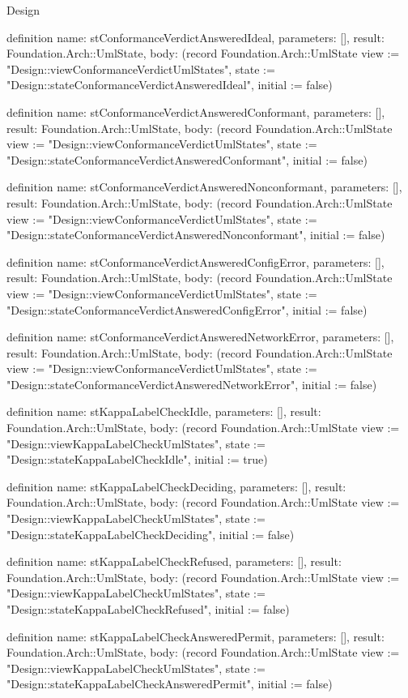 \begin{lexlean}{Design}
\begin{semanticmodule}
definition{
  name: stConformanceVerdictAnsweredIdeal,
  parameters: [],
  result: Foundation.Arch::UmlState,
  body: (record Foundation.Arch::UmlState {view := "Design::viewConformanceVerdictUmlStates", state := "Design::stateConformanceVerdictAnsweredIdeal", initial := false})
}

definition{
  name: stConformanceVerdictAnsweredConformant,
  parameters: [],
  result: Foundation.Arch::UmlState,
  body: (record Foundation.Arch::UmlState {view := "Design::viewConformanceVerdictUmlStates", state := "Design::stateConformanceVerdictAnsweredConformant", initial := false})
}

definition{
  name: stConformanceVerdictAnsweredNonconformant,
  parameters: [],
  result: Foundation.Arch::UmlState,
  body: (record Foundation.Arch::UmlState {view := "Design::viewConformanceVerdictUmlStates", state := "Design::stateConformanceVerdictAnsweredNonconformant", initial := false})
}

definition{
  name: stConformanceVerdictAnsweredConfigError,
  parameters: [],
  result: Foundation.Arch::UmlState,
  body: (record Foundation.Arch::UmlState {view := "Design::viewConformanceVerdictUmlStates", state := "Design::stateConformanceVerdictAnsweredConfigError", initial := false})
}

definition{
  name: stConformanceVerdictAnsweredNetworkError,
  parameters: [],
  result: Foundation.Arch::UmlState,
  body: (record Foundation.Arch::UmlState {view := "Design::viewConformanceVerdictUmlStates", state := "Design::stateConformanceVerdictAnsweredNetworkError", initial := false})
}

definition{
  name: stKappaLabelCheckIdle,
  parameters: [],
  result: Foundation.Arch::UmlState,
  body: (record Foundation.Arch::UmlState {view := "Design::viewKappaLabelCheckUmlStates", state := "Design::stateKappaLabelCheckIdle", initial := true})
}

definition{
  name: stKappaLabelCheckDeciding,
  parameters: [],
  result: Foundation.Arch::UmlState,
  body: (record Foundation.Arch::UmlState {view := "Design::viewKappaLabelCheckUmlStates", state := "Design::stateKappaLabelCheckDeciding", initial := false})
}

definition{
  name: stKappaLabelCheckRefused,
  parameters: [],
  result: Foundation.Arch::UmlState,
  body: (record Foundation.Arch::UmlState {view := "Design::viewKappaLabelCheckUmlStates", state := "Design::stateKappaLabelCheckRefused", initial := false})
}

definition{
  name: stKappaLabelCheckAnsweredPermit,
  parameters: [],
  result: Foundation.Arch::UmlState,
  body: (record Foundation.Arch::UmlState {view := "Design::viewKappaLabelCheckUmlStates", state := "Design::stateKappaLabelCheckAnsweredPermit", initial := false})
}


\end{semanticmodule}
\end{lexlean}
